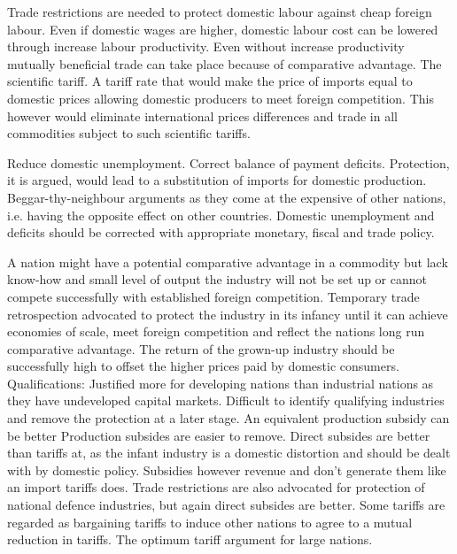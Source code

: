 \documentclass[12pt]{examnotes}
\begin{document}
 Trade restrictions are needed to protect domestic labour against cheap foreign labour. Even if domestic wages are higher, domestic labour cost can be lowered through increase labour productivity. Even without increase productivity mutually beneficial trade can take place because of comparative advantage.
 The scientific tariff. A tariff rate that would make the price of imports equal to domestic prices allowing domestic producers to meet foreign competition. This however would eliminate international prices differences and trade in all commodities subject to such scientific tariffs.

 Reduce domestic unemployment.  
 Correct balance of payment deficits.
\ra Protection, it is argued, would lead to a substitution of imports for domestic production.
\ra Beggar-thy-neighbour arguments as they come at the expensive of other nations, i.e. having the opposite effect on other countries. 
\ra Domestic unemployment and deficits should be corrected with appropriate monetary, fiscal and trade policy.

\ra A nation might have a potential comparative advantage in a commodity but lack know-how and small level of output the industry will not be set up or cannot compete successfully with established foreign competition.
\ra Temporary trade retrospection advocated to protect the industry in its infancy until it can achieve economies of scale, meet foreign competition and reflect the nations long run comparative advantage.
\ra The return of the grown-up industry should be successfully high to offset the higher prices paid by domestic consumers.
\ra Qualifications:
 Justified more for developing nations than industrial nations as they have undeveloped capital markets.
 Difficult to identify qualifying industries and remove the protection at a later stage.
 An equivalent production subsidy can be better Production subsides are easier to remove. 
\ra Direct subsides are better than tariffs at, as the infant industry is a domestic distortion and should be dealt with by domestic policy. Subsidies however revenue and don't generate them like an import tariffs does.
\ra Trade restrictions are also advocated for protection of national defence industries, but again direct subsides are better.
\ra Some tariffs are regarded as bargaining tariffs to induce other nations to agree to a mutual reduction in tariffs. 
\ra The optimum tariff argument for large nations.
\end{document}
